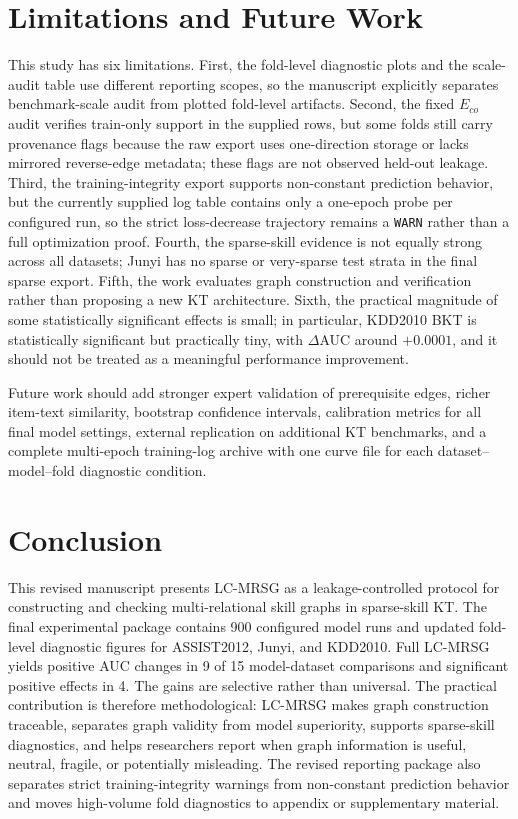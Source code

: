 \documentclass[11pt,a4paper]{article}
\newcommand{\Eco}{$E_{co}$}
\newcommand{\LCMRSG}{LC-MRSG}
\begin{document}
\section{Limitations and Future Work}
This study has six limitations. First, the fold-level diagnostic plots and the scale-audit table use different reporting scopes, so the manuscript explicitly separates benchmark-scale audit from plotted fold-level artifacts. Second, the fixed \Eco{} audit verifies train-only support in the supplied rows, but some folds still carry provenance flags because the raw export uses one-direction storage or lacks mirrored reverse-edge metadata; these flags are not observed held-out leakage. Third, the training-integrity export supports non-constant prediction behavior, but the currently supplied log table contains only a one-epoch probe per configured run, so the strict loss-decrease trajectory remains a \texttt{WARN} rather than a full optimization proof. Fourth, the sparse-skill evidence is not equally strong across all datasets; Junyi has no sparse or very-sparse test strata in the final sparse export. Fifth, the work evaluates graph construction and verification rather than proposing a new KT architecture. Sixth, the practical magnitude of some statistically significant effects is small; in particular, KDD2010 BKT is statistically significant but practically tiny, with $\Delta$AUC around $+0.0001$, and it should not be treated as a meaningful performance improvement.

Future work should add stronger expert validation of prerequisite edges, richer item-text similarity, bootstrap confidence intervals, calibration metrics for all final model settings, external replication on additional KT benchmarks, and a complete multi-epoch training-log archive with one curve file for each dataset--model--fold diagnostic condition.

\section{Conclusion}
This revised manuscript presents \LCMRSG{} as a leakage-controlled protocol for constructing and checking multi-relational skill graphs in sparse-skill KT. The final experimental package contains 900 configured model runs and updated fold-level diagnostic figures for ASSIST2012, Junyi, and KDD2010. Full \LCMRSG{} yields positive AUC changes in 9 of 15 model-dataset comparisons and significant positive effects in 4. The gains are selective rather than universal. The practical contribution is therefore methodological: \LCMRSG{} makes graph construction traceable, separates graph validity from model superiority, supports sparse-skill diagnostics, and helps researchers report when graph information is useful, neutral, fragile, or potentially misleading. The revised reporting package also separates strict training-integrity warnings from non-constant prediction behavior and moves high-volume fold diagnostics to appendix or supplementary material.
\end{document}
